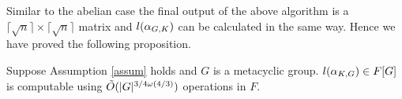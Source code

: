Similar to the abelian case the final output of the above algorithm is a $\lceil \sqrt{n} \rceil \times \lceil \sqrt{n} \rceil $
matrix and $l(\alpha_{G,K})$ can be calculated in the same way. Hence we have proved the following proposition.
 
\begin{proposition}
Suppose Assumption \ref{assum} holds and $G$ is a metacyclic group. $l(\alpha_{K,G}) \in F[G]$ is computable using $\tilde{O}(\vert G \vert ^{3/4 \omega(4/3)})$ 
operations in $F$.
\end{proposition}

